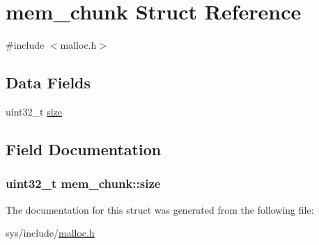 \hypertarget{structmem__chunk}{\section{mem\-\_\-chunk Struct Reference}
\label{structmem__chunk}
}


{\ttfamily \#include $<$malloc.\-h$>$}

\subsection*{Data Fields}
\begin{DoxyCompactItemize}
\item 
uint32\-\_\-t \hyperlink{structmem__chunk_a6c249814794488c18a42bcf180e3c024}{size}
\end{DoxyCompactItemize}


\subsection{Field Documentation}
\hypertarget{structmem__chunk_a6c249814794488c18a42bcf180e3c024}{
\subsubsection[{size}]{\setlength{\rightskip}{0pt plus 5cm}uint32\-\_\-t mem\-\_\-chunk\-::size}}\label{structmem__chunk_a6c249814794488c18a42bcf180e3c024}


The documentation for this struct was generated from the following file\-:\begin{DoxyCompactItemize}
\item 
sys/include/\hyperlink{malloc_8h}{malloc.\-h}\end{DoxyCompactItemize}
